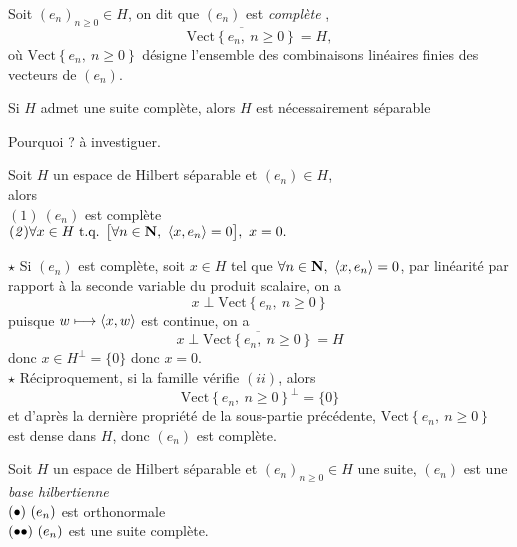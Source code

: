 \documentclass[a4paper,11pt, twoside]{article}
\begin{document}



\begin{Def}
  Soit $(e_n)_{n\geqslant 0}\in H$, on dit que $(e_n)$ est \emph{complète} \ssi,\\
  $$\overline{\mathrm{Vect}\left\{e_n,\ n\geqslant 0\right\}}=H,$$
  où $\mathrm{Vect}\left\{e_n,\ n\geqslant 0\right\}$ désigne l'ensemble des combinaisons linéaires finies des vecteurs de $(e_n)$.
\end{Def}



\begin{RQ}
  Si $H$ admet une suite complète, alors $H$ est nécessairement séparable
\end{RQ}


\begin{Proof}
  Pourquoi ? à investiguer.
\end{Proof}


\begin{prop}
  Soit $H$ un espace de Hilbert séparable et $(e_n)\in H$,\\

  alors \lasse\\
  $(\mathit 1)\ (e_n)$ est complète\\
  $(\mathit 2)\forall x\in H\text{ t.q. } \big[\forall n\in\mathbf N,\ \left\langle x,e_n \right\rangle=0\big],\ x=0.$
\end{prop}


\begin{Proof}
  $\star$ Si $(e_n)$ est complète, soit $x\in H$ tel que $\forall n\in \N,\ \ps{x,e_n}=0$, par linéarité par rapport à la seconde variable du produit scalaire, on a 
  $$x\perp\mathrm{Vect}\left\{e_n,\ n\geqslant 0\right\}$$
  puisque $w\longmapsto\left\langle x,w \right\rangle$ est continue, on a 
  $$x\perp\overline{\mathrm{Vect}\left\{e_n,\ n\geqslant 0\right\}}=H$$
  donc $x\in H^\bot=\{0\}$ donc $x=0$.\\

  $\star$ Réciproquement, si la famille vérifie $(ii)$, alors 
  $$\mathrm{Vect}\left\{e_n,\ n\geqslant 0\right\}^\bot=\{0\}$$
  et d'après la dernière propriété de la sous-partie précédente, $\mathrm{Vect}\left\{e_n,\ n\geqslant 0\right\}$ est dense dans $H$, donc $(e_n)$ est complète.
\end{Proof}


\begin{Def}
  Soit $H$ un espace de Hilbert séparable et $(e_n)_{n\geqslant 0}\in H$ une suite, $(e_n)$ est une \emph{base hilbertienne} \ssi\\
  $(\bullet)\ (e_n)$ est orthonormale\\
  $(\bullet\bullet)\ (e_n)$ est une suite complète.
\end{Def}
\end{document}
